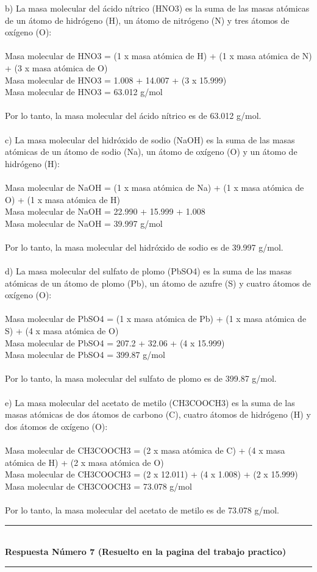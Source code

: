 \documentclass{article}
\begin{document}
b) La masa molecular del ácido nítrico (HNO3) es la suma de las masas atómicas de un átomo de hidrógeno (H), un átomo de nitrógeno (N) y tres átomos de oxígeno (O):\\
\\
Masa molecular de HNO3 = (1 x masa atómica de H) + (1 x masa atómica de N) + (3 x masa atómica de O)\\
Masa molecular de HNO3 = 1.008 + 14.007 + (3 x 15.999)\\
Masa molecular de HNO3 = 63.012 g/mol\\
\\
Por lo tanto, la masa molecular del ácido nítrico es de 63.012 g/mol.\\
\\
c) La masa molecular del hidróxido de sodio (NaOH) es la suma de las masas atómicas de un átomo de sodio (Na), un átomo de oxígeno (O) y un átomo de hidrógeno (H):\\
\\
Masa molecular de NaOH = (1 x masa atómica de Na) + (1 x masa atómica de O) + (1 x masa atómica de H)\\
Masa molecular de NaOH = 22.990 + 15.999 + 1.008\\
Masa molecular de NaOH = 39.997 g/mol\\
\\
Por lo tanto, la masa molecular del hidróxido de sodio es de 39.997 g/mol.\\
\\
d) La masa molecular del sulfato de plomo (PbSO4) es la suma de las masas atómicas de un átomo de plomo (Pb), un átomo de azufre (S) y cuatro átomos de oxígeno (O):\\
\\
Masa molecular de PbSO4 = (1 x masa atómica de Pb) + (1 x masa atómica de S) + (4 x masa atómica de O)\\
Masa molecular de PbSO4 = 207.2 + 32.06 + (4 x 15.999)\\
Masa molecular de PbSO4 = 399.87 g/mol\\
\\
Por lo tanto, la masa molecular del sulfato de plomo es de 399.87 g/mol.\\
\\
e) La masa molecular del acetato de metilo (CH3COOCH3) es la suma de las masas atómicas de dos átomos de carbono (C), cuatro átomos de hidrógeno (H) y dos átomos de oxígeno (O):\\
\\
Masa molecular de CH3COOCH3 = (2 x masa atómica de C) + (4 x masa atómica de H) + (2 x masa atómica de O)\\
Masa molecular de CH3COOCH3 = (2 x 12.011) + (4 x 1.008) + (2 x 15.999)\\
Masa molecular de CH3COOCH3 = 73.078 g/mol\\
\\
Por lo tanto, la masa molecular del acetato de metilo es de 73.078 g/mol.\\
\noindent\rule{\textwidth}{1pt} \\
\textbf{Respuesta Número 7 (Resuelto en la pagina del trabajo practico)} \\
\noindent\rule{\textwidth}{1pt} \\
\end{document}
